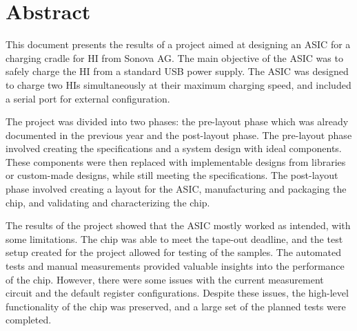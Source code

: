 \section*{\huge Abstract}
This document presents the results of a project aimed at designing an \ac{ASIC} for a charging cradle for \ac{HI} from Sonova AG. The main objective of the \ac{ASIC} was to safely charge the HI from a standard USB power supply. The \ac{ASIC} was designed to charge two HIs simultaneously at their maximum charging speed, and included a serial port for external configuration.

The project was divided into two phases: the pre-layout phase which was already documented in the previous year and the post-layout phase. The pre-layout phase involved creating the specifications and a system design with ideal components. These components were then replaced with implementable designs from libraries or custom-made designs, while still meeting the specifications. 
The post-layout phase involved creating a layout for the ASIC, manufacturing and packaging the chip, and validating and characterizing the chip.

The results of the project showed that the \ac{ASIC} mostly worked as intended, with some limitations. The chip was able to meet the tape-out deadline, and the test setup created for the project allowed for testing of the samples. The automated tests and manual measurements provided valuable insights into the performance of the chip. However, there were some issues with the current measurement circuit and the default register configurations. Despite these issues, the high-level functionality of the chip was preserved, and a large set of the planned tests were completed.
\label{chap:abstract}
\clearpage